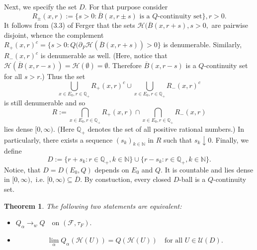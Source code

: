 \documentclass[sn-mathphys,Numbered]{sn-jnl}%
\theoremstyle{thmstyleone}%
\newtheorem{theorem}{Theorem}%
\theoremstyle{thmstyletwo}%
\theoremstyle{thmstylethree}%
\begin{document}
Next, we specify the set $D$. For that purpose consider
$$
 R_\pm(x,r):=\{s>0: \overline{B}(x,r\pm s) \text{ is a } Q\text{-continuity set}\}, r>0.
$$
It follows from (3.3) of Ferger \cite{Ferger3} that the sets $\mathcal{H}(\overline{B}(x,r+s), s>0,$ are pairwise disjoint, whence the complement
$R_+(x,r)^c= \{s>0: Q(\partial_F \mathcal{H}(\overline{B}(x,r+s))>0\}$ is denumerable. Similarly, $R_-(x,r)^c$ is denumerable as well.
(Here, notice that $\mathcal{H}(\overline{B}(x,r - s))= \mathcal{H}(\emptyset)=\emptyset$. Therefore $\overline{B}(x,r - s)$ is a $Q$-continuity set for all $s>r$.)
Thus the set
$$
 \bigcup_{x \in E_0, r \in \mathbb{Q}_+} R_+(x,r)^c \cup \bigcup_{x \in E_0, r \in \mathbb{Q}_+} R_-(x,r)^c
$$
is still denumerable and so
$$
 R:= \bigcap_{x \in E_0, r \in \mathbb{Q}_+} R_+(x,r) \cap \bigcap_{x \in E_0, r \in \mathbb{Q}_+} R_-(x,r)
$$
lies dense $[0,\infty)$. (Here $\mathbb{Q}_+$ denotes the set of all positive rational numbers.) In particularly, there exists a sequence $(s_k)_{k \in \mathbb{N}}$ in $R$ such that $s_k \downarrow 0$.
Finally, we define
$$D:=\{r + s_k: r \in \mathbb{Q}_+, k \in \mathbb{N} \} \cup \{r - s_k: r \in \mathbb{Q}_+, k \in \mathbb{N} \}.$$
Notice, that $D=D(E_0,Q)$ depends on $E_0$ and $Q$. It is countable and lies dense in $[0,\infty),$ i.e. $[0,\infty) \subseteq \overline{D}.$
By constuction, every closed $D$-ball is a $Q$-continuity set.\\


\begin{theorem} \label{UD} The following two statements are equivalent:
\begin{itemize}
\item[(1)] $Q_\alpha \longrightarrow_w Q \quad \text{on } (\mathcal{F},\tau_F).$
\item[(2)]
\begin{equation} \label{convergencedeterminingclass}
 \lim_\alpha Q_\alpha(\mathcal{H}(U))=Q(\mathcal{H}(U)) \quad \text{for all }  U \in \mathcal{U}(D).
\end{equation}
\end{itemize}
\end{theorem}
\end{document}
